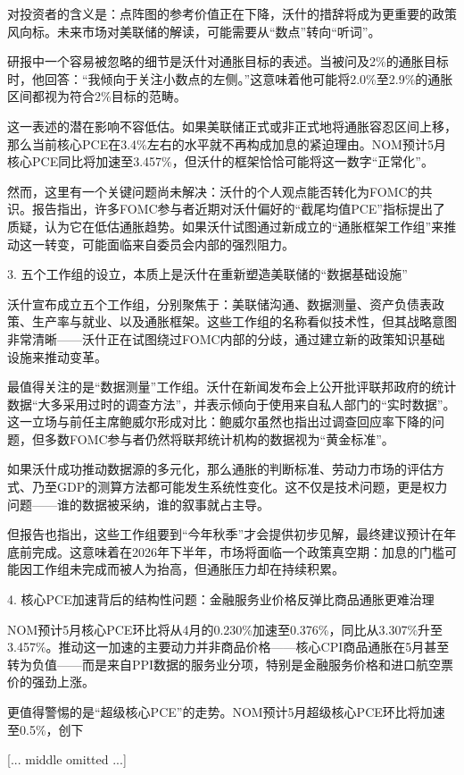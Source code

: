 \documentclass[11pt]{ctexart}
\begin{document}
对投资者的含义是：点阵图的参考价值正在下降，沃什的措辞将成为更重要的政策风向标。未来市场对美联储的解读，可能需要从“数点”转向“听词”。

研报中一个容易被忽略的细节是沃什对通胀目标的表述。当被问及2\%的通胀目标时，他回答：“我倾向于关注小数点的左侧。”这意味着他可能将2.0\%至2.9\%的通胀区间都视为符合2\%目标的范畴。

这一表述的潜在影响不容低估。如果美联储正式或非正式地将通胀容忍区间上移，那么当前核心PCE在3.4\%左右的水平就不再构成加息的紧迫理由。NOM预计5月核心PCE同比将加速至3.457\%，但沃什的框架恰恰可能将这一数字“正常化”。

然而，这里有一个关键问题尚未解决：沃什的个人观点能否转化为FOMC的共识。报告指出，许多FOMC参与者近期对沃什偏好的“截尾均值PCE”指标提出了质疑，认为它在低估通胀趋势。如果沃什试图通过新成立的“通胀框架工作组”来推动这一转变，可能面临来自委员会内部的强烈阻力。

3. 五个工作组的设立，本质上是沃什在重新塑造美联储的“数据基础设施”

沃什宣布成立五个工作组，分别聚焦于：美联储沟通、数据测量、资产负债表政策、生产率与就业、以及通胀框架。这些工作组的名称看似技术性，但其战略意图非常清晰——沃什正在试图绕过FOMC内部的分歧，通过建立新的政策知识基础设施来推动变革。

最值得关注的是“数据测量”工作组。沃什在新闻发布会上公开批评联邦政府的统计数据“大多采用过时的调查方法”，并表示倾向于使用来自私人部门的“实时数据”。这一立场与前任主席鲍威尔形成对比：鲍威尔虽然也指出过调查回应率下降的问题，但多数FOMC参与者仍然将联邦统计机构的数据视为“黄金标准”。

如果沃什成功推动数据源的多元化，那么通胀的判断标准、劳动力市场的评估方式、乃至GDP的测算方法都可能发生系统性变化。这不仅是技术问题，更是权力问题——谁的数据被采纳，谁的叙事就占主导。

但报告也指出，这些工作组要到“今年秋季”才会提供初步见解，最终建议预计在年底前完成。这意味着在2026年下半年，市场将面临一个政策真空期：加息的门槛可能因工作组未完成而被人为抬高，但通胀压力却在持续积累。

4. 核心PCE加速背后的结构性问题：金融服务业价格反弹比商品通胀更难治理

NOM预计5月核心PCE环比将从4月的0.230\%加速至0.376\%，同比从3.307\%升至3.457\%。推动这一加速的主要动力并非商品价格——核心CPI商品通胀在5月甚至转为负值——而是来自PPI数据的服务业分项，特别是金融服务价格和进口航空票价的强劲上涨。

更值得警惕的是“超级核心PCE”的走势。NOM预计5月超级核心PCE环比将加速至0.5\%，创下

[... middle omitted ...]
\end{document}
